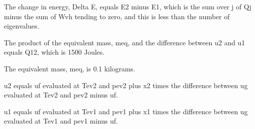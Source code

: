 The change in energy, Delta E, equals E2 minus E1, which is the sum over j of Qj minus the sum of Wvh tending to zero, and this is less than the number of eigenvalues.

The product of the equivalent mass, meq, and the difference between u2 and u1 equals Q12, which is 1500 Joules.

The equivalent mass, meq, is 0.1 kilograms.

u2 equals uf evaluated at Tev2 and pev2 plus x2 times the difference between ug evaluated at Tev2 and pev2 minus uf.

u1 equals uf evaluated at Tev1 and pev1 plus x1 times the difference between ug evaluated at Tev1 and pev1 minus uf.